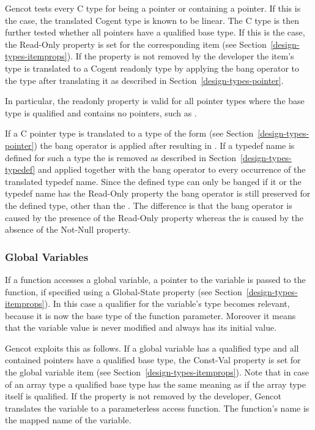 Gencot tests every C type for being a pointer or containing a pointer. If this is the case, the translated Cogent 
type is known to be linear. The C type is then further tested whether all pointers have a  qualified
base type. If this is the case, the Read-Only property is set for the corresponding item (see Section~\ref{design-types-itemprops}). 
If the property is not removed by the developer the item's type is translated to a Cogent readonly type
by applying the bang operator \code{!} to the type after translating it as described in Section~\ref{design-types-pointer}.

In particular, the readonly property is valid for all pointer types where the base type is  qualified 
and contains no pointers, such as .

If a C pointer type is translated to a type of the form  (see Section~\ref{design-types-pointer}) the bang operator
is applied after  resulting in . If a typedef name is defined for such a type the
 is removed as described in Section~\ref{design-types-typedef} and applied together with the bang operator
to every occurrence of the translated typedef name. Since the defined type can only be banged if it or the typedef name
has the Read-Only property the bang operator is still preserved for the defined type, other than the . 
The difference is that the bang operator is caused by the presence of the Read-Only property whereas the 
is caused by the absence of the Not-Null property.

\subsubsection{Global Variables}

If a function accesses a global variable, a pointer to the variable is passed to the function, if specified using
a Global-State property (see Section~\ref{design-types-itemprops}). In this case a  qualifier for the 
variable's type becomes relevant, because it is now the base type of the function parameter. Moreover it means
that the variable value is never modified and always has its initial value.

Gencot exploits this as follows. If a global variable has a  qualified type and all contained pointers
have a  qualified base type, the Const-Val property is set for the global variable item (see 
Section~\ref{design-types-itemprops}). Note that in case of an array type a  qualified base type has the 
same meaning as if the array type itself is  qualified. If the property is not removed by the developer, 
Gencot translates the variable to a parameterless access function. The function's name is the mapped name of the variable.

